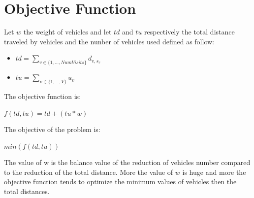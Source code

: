 \section{Objective Function}
Let \begin{math}w\end{math} the weight of vehicles and let \begin{math} td\end{math} and \begin{math}tu\end{math} respectively the total distance traveled by vehicles and the nunber of vehicles used defined as follow: 
\begin{itemize}
    \item \begin{math}td = \sum_{v \in \{1,...,NumVisits\}}d_{v, s_{v}}\end{math}
    \item \begin{math}tu = \sum_{v \in \{1,...,V\}}u_{v}\end{math}
\end{itemize}
The objective function is:
\begin{center}
    \begin{math}f(td,tu) = td + (tu * w)\end{math}
\end{center}
The objective of the problem is:
\begin{center}
    \begin{math}min(f(td,tu))\end{math}
\end{center}
The value of w is the balance value of the reduction of vehicles number compared to the reduction of the total distance. More the value of \begin{math}w\end{math} is huge and more the objective function tends to optimize the minimum values of vehicles then the total distances.

